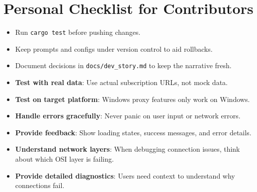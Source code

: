 \section{Personal Checklist for Contributors}
\begin{itemize}
    \item Run \texttt{cargo test} before pushing changes.
    \item Keep prompts and configs under version control to aid rollbacks.
    \item Document decisions in \texttt{docs/dev\_story.md} to keep the narrative fresh.
    \item \textbf{Test with real data}: Use actual subscription URLs, not mock data.
    \item \textbf{Test on target platform}: Windows proxy features only work on Windows.
    \item \textbf{Handle errors gracefully}: Never panic on user input or network errors.
    \item \textbf{Provide feedback}: Show loading states, success messages, and error details.
    \item \textbf{Understand network layers}: When debugging connection issues, think about which OSI layer is failing.
    \item \textbf{Provide detailed diagnostics}: Users need context to understand why connections fail.
\end{itemize}

